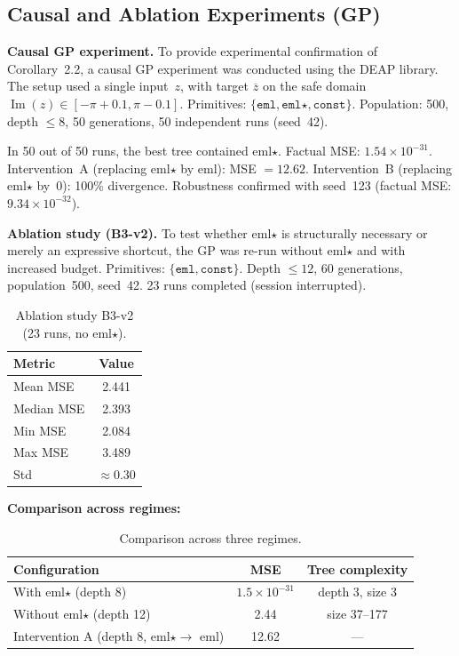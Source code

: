 \documentclass[11pt,a4paper]{article}
\begin{document}
\subsection{Causal and Ablation Experiments (GP)}

\textbf{Causal GP experiment.} To provide experimental confirmation of Corollary~2.2, a causal GP experiment was conducted using the DEAP library. The setup used a single input~$z$, with target $\overline{z}$ on the safe domain $\operatorname{Im}(z) \in [-\pi + 0.1, \pi - 0.1]$. Primitives: $\{\texttt{eml}, \texttt{eml}\star, \texttt{const}\}$. Population: 500, depth $\leq 8$, 50 generations, 50 independent runs (seed~42).

In 50 out of 50 runs, the best tree contained eml$\star$. Factual MSE: $1.54 \times 10^{-31}$. Intervention~A (replacing eml$\star$ by eml): MSE $= 12.62$. Intervention~B (replacing eml$\star$ by~0): 100\% divergence. Robustness confirmed with seed~123 (factual MSE: $9.34 \times 10^{-32}$).

\textbf{Ablation study (B3-v2).} To test whether eml$\star$ is structurally necessary or merely an expressive shortcut, the GP was re-run without eml$\star$ and with increased budget. Primitives: $\{\texttt{eml}, \texttt{const}\}$. Depth $\leq 12$, 60 generations, population~500, seed~42. 23 runs completed (session interrupted).

\begin{table}[h]
\centering
\begin{tabular}{lc}
\toprule
Metric & Value \\
\midrule
Mean MSE & 2.441 \\
Median MSE & 2.393 \\
Min MSE & 2.084 \\
Max MSE & 3.489 \\
Std & $\approx 0.30$ \\
\bottomrule
\end{tabular}
\caption{Ablation study B3-v2 (23 runs, no eml$\star$).}
\end{table}

\textbf{Comparison across regimes:}

\begin{table}[h]
\centering
\begin{tabular}{lcc}
\toprule
Configuration & MSE & Tree complexity \\
\midrule
With eml$\star$ (depth 8) & $1.5 \times 10^{-31}$ & depth 3, size 3 \\
Without eml$\star$ (depth 12) & 2.44 & size 37--177 \\
Intervention A (depth 8, eml$\star \to$ eml) & 12.62 & --- \\
\bottomrule
\end{tabular}
\caption{Comparison across three regimes.}
\end{table}
\end{document}
